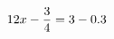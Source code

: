 \documentclass[preview]{standalone}
\begin{document}
\begin{align*}
\special{dvisvgm:raw <g id='unique000'>}12x - \frac{3}{4} = 3 - 0.3\special{dvisvgm:raw </g>}
\end{align*}
\end{document}
